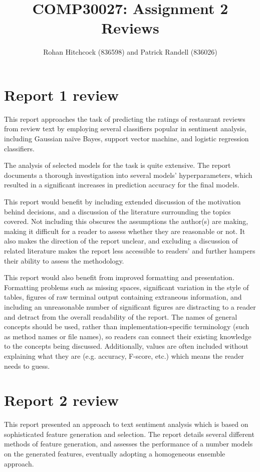 \documentclass[11pt]{article}
\begin{document}
\title{\textbf{COMP30027: Assignment 2 Reviews}}
\author{Rohan Hitchcock (836598) and Patrick Randell (836026)}
\date{}
\maketitle

\section*{Report 1 review}

This report approaches the task of predicting the ratings of restaurant reviews from review text by employing several classifiers popular in sentiment analysis, including Gaussian na\"{i}ve Bayes, support vector machine, and logistic regression classifiers. 

The analysis of selected models for the task is quite extensive. The report documents a thorough investigation into several models' hyperparameters, which resulted in a significant increases in prediction accuracy for the final models.

This report would benefit by including extended discussion of the motivation behind decisions, and a discussion of the literature surrounding the topics covered. Not including this obscures the assumptions the author(s) are making, making it difficult for a reader to assess whether they are reasonable or not. It also makes the direction of the report unclear, and excluding a discussion of related literature makes the report less accessible to readers' and further hampers their ability to assess the methodology. 

This report would also benefit from improved formatting and presentation. Formatting problems such as missing spaces, significant variation in the style of tables, figures of raw terminal output containing extraneous information, and including an unreasonable number of significant figures are distracting to a reader and detract from the overall readability of the report. The names of general concepts should be used, rather than implementation-specific terminology (such as method names or file names), so readers can connect their existing knowledge to the concepts being discussed. Additionally, values are often included without explaining what they are (e.g. accuracy, F-score, etc.) which means the reader needs to guess.

\section*{Report 2 review}
This report presented an approach to text sentiment analysis which is based on sophisticated feature generation and selection. The report details several different methods of feature generation, and assesses the performance of a number models on the generated features, eventually adopting a homogeneous ensemble approach.
\end{document}
